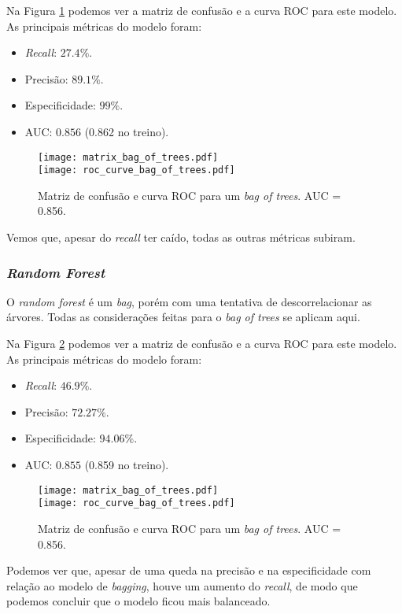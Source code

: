 Na Figura \ref{bag of trees metric} podemos ver a matriz de confusão e a curva ROC para este modelo.
As principais métricas do modelo foram:
\begin{itemize}
    \item \emph{Recall}: \( 27.4 \% \).
    \item Precisão: \( 89.1 \% \).
    \item Especificidade: \( 99 \% \).
    \item AUC: \( 0.856 \) (0.862 no treino).
\end{itemize}
\begin{figure}[htb]
    \begin{center}
        \texttt{[image: matrix\_bag\_of\_trees.pdf]} \\
        \texttt{[image: roc\_curve\_bag\_of\_trees.pdf]}
    \end{center}
    \caption{Matriz de confusão e curva ROC para um \emph{bag of trees}. AUC = 0.856.}
    \label{bag of trees metric}
\end{figure}
Vemos que, apesar do \emph{recall} ter caído, todas as outras métricas subiram.

\subsubsection{\emph{Random Forest}}

O \emph{random forest} é um \emph{bag}, porém com uma tentativa de descorrelacionar as árvores.
Todas as considerações feitas para o \emph{bag of trees} se aplicam aqui.

Na Figura \ref{random forest metric} podemos ver a matriz de confusão e a curva ROC para este modelo.
As principais métricas do modelo foram:
\begin{itemize}
    \item \emph{Recall}: \( 46.9 \% \).
    \item Precisão: \( 72.27 \% \).
    \item Especificidade: \( 94.06 \% \).
    \item AUC: \( 0.855 \) (0.859 no treino).
\end{itemize}
\begin{figure}[htb]
    \begin{center}
        \texttt{[image: matrix\_bag\_of\_trees.pdf]} \\
        \texttt{[image: roc\_curve\_bag\_of\_trees.pdf]}
    \end{center}
    \caption{Matriz de confusão e curva ROC para um \emph{bag of trees}. AUC = 0.856.}
    \label{random forest metric}
\end{figure}
Podemos ver que, apesar de uma queda na precisão e na especificidade com relação ao modelo de \emph{bagging}, houve um aumento do \emph{recall}, de modo que podemos concluir que o modelo ficou mais balanceado.

